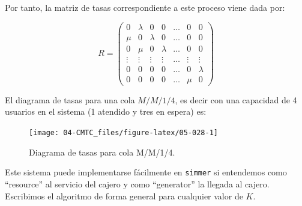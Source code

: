 \documentclass[
]{book}
\theoremstyle{definition}
\theoremstyle{definition}
\theoremstyle{definition}
\theoremstyle{definition}
\theoremstyle{remark}
\begin{document}
Por tanto, la matriz de tasas correspondiente a este proceso viene dada por:

\[R = 
\begin{pmatrix}
0 & \lambda & 0 & 0 & \ldots & 0 & 0 \\
\mu & 0 & \lambda & 0 & \ldots & 0 & 0 \\
0 & \mu & 0 & \lambda & \ldots & 0 & 0 \\
\vdots & \vdots & \vdots & \vdots & \ldots & \vdots & \vdots \\
0 & 0 & 0 & 0 & \ldots & 0 & \lambda \\
0 & 0 & 0 & 0 & \ldots &\mu & 0
\end{pmatrix} \]

El diagrama de tasas para una cola \(M/M/1/4\), es decir con una capacidad de 4 usuarios en el sistema (1 atendido y tres en espera) es:

\begin{figure}

{\centering \texttt{[image: 04-CMTC\_files/figure-latex/05-028-1]} 

}

\caption{Diagrama de tasas para cola M/M/1/4.}\label{fig:05-028}
\end{figure}

Este sistema puede implementarse fácilmente en \texttt{simmer} si entendemos como ``resource'' al servicio del cajero y como ``generator'' la llegada al cajero. Escribimos el algoritmo de forma general para cualquier valor de \(K\).
\end{document}
